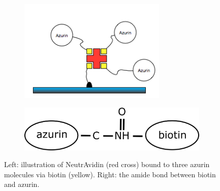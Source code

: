 \documentclass[twoside,single]{lion-msc}
\begin{document}
\begin{figure}[ht!]
\begin{subfigure}{.5\textwidth}

\includegraphics[width=70mm]{ratio_avadin}
\end{subfigure}%
\begin{subfigure}{.5\textwidth}
\includegraphics[width=.8\linewidth]{prot_neutr}
\end{subfigure}
\caption{Left: illustration of NeutrAvidin (red cross) bound to three azurin molecules via biotin (yellow). Right: the amide bond between biotin and azurin.}
\label{avidinratio}
\end{figure}
\end{document}
